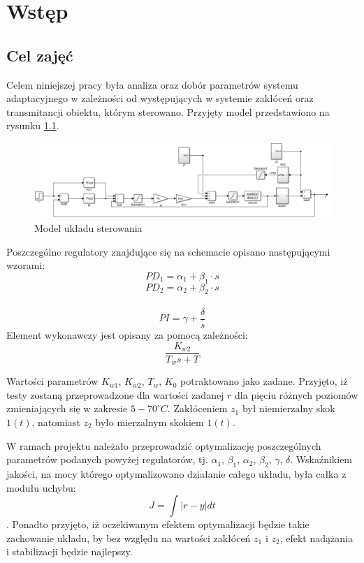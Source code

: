 \chapter{Wstęp}

\section{Cel zajęć}
Celem niniejszej pracy była analiza oraz dobór parametrów systemu adaptacyjnego w zależności od występujących w systemie zakłóceń oraz transmitancji obiektu, którym sterowano. Przyjęty model przedstawiono na rysunku \ref{model_systemu}.

\begin{figure}[h!]
	\centering
	\includegraphics[scale = 0.6]{fig/model_systemu.png}
	\caption		
	{Model układu sterowania}
	\label{model_systemu}
\end{figure} 

Poszczególne regulatory znajdujące się na schemacie opisano następującymi wzorami: 
\begin{equation}\label{reg1}
PD_1 = \alpha_1+\beta_1 \cdot s
\end{equation}
\begin{equation}\label{reg2}
PD_2 = \alpha_2+\beta_2 \cdot s
\end{equation}\\
\begin{equation}\label{reg3}
PI = \gamma + \dfrac{\delta}{s}
\end{equation}
Element wykonawczy jest opisany za pomocą zależności:
\begin{equation}\label{actuator}
\dfrac{K_{w2}}{T_w s+T}
\end{equation}

Wartości parametrów $K_{w1}$, $K_{w2}$, $T_w$, $K_0$ potraktowano jako zadane. Przyjęto, iż testy zostaną przeprowadzone dla wartości zadanej $r$ dla pięciu różnych poziomów zmieniających się w zakresie $5-70^{\circ} C$. Zakłóceniem $z_1$ był niemierzalny skok $1(t)$, natomiast $z_2$ było mierzalnym skokiem $1(t)$.

W ramach projektu należało przeprowadzić optymalizację poszczególnych parametrów podanych powyżej regulatorów, tj. $\alpha_1$, $\beta_1$, $\alpha_2$, $\beta_2$, $\gamma$, $\delta$. Wskaźnikiem jakości, na mocy którego optymalizowano działanie całego układu, była całka z modułu uchybu:
\begin{equation}\label{wsk_jak}
J = \int |r-y| dt
\end{equation}. Ponadto przyjęto, iż oczekiwanym efektem optymalizacji będzie takie zachowanie układu, by bez względu na wartości zakłóceń $z_1$ i $z_2$, efekt nadążania i stabilizacji będzie najlepszy.

